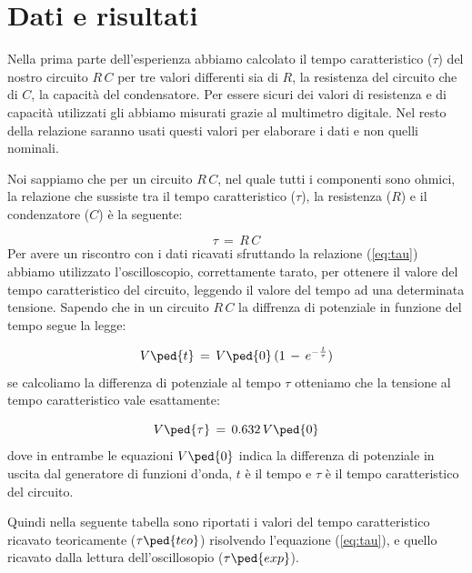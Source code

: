 \section*{Dati e risultati}

Nella prima parte dell'esperienza abbiamo calcolato il tempo caratteristico ($\tau$) del nostro circuito $R\,C$ per tre valori differenti sia di $R$, la resistenza del circuito che di $C$, la capacità del condensatore. Per essere sicuri dei valori di resistenza e di capacità utilizzati gli abbiamo misurati grazie al multimetro digitale. Nel resto della relazione saranno usati questi valori per elaborare i dati e non quelli nominali.

Noi sappiamo che per un circuito $R\,C$, nel quale tutti i componenti sono ohmici, la relazione che sussiste tra il tempo caratteristico ($\tau$), la resistenza ($R$) e il condenzatore ($C$) è la seguente:

\begin{equation}
	\tau \,=\, R\,C
	\label{eq:tau}
\end{equation}
%
Per avere un riscontro con i dati ricavati sfruttando la relazione (\ref{eq:tau}) abbiamo utilizzato l'oscilloscopio, correttamente tarato, per ottenere il valore del tempo caratteristico del circuito, leggendo il valore del tempo ad una determinata tensione. Sapendo che in un circuito $R\,C$ la diffrenza di potenziale in funzione del tempo segue la legge:

\begin{equation}
	V\ped{t} \,=\, V\ped{0}\,(1\,-\,e^{-\frac{t}{\tau}})
	\label{eq:potenziale}
\end{equation}
%
se calcoliamo la differenza di potenziale al tempo $\tau$ otteniamo che la tensione al tempo caratteristico vale esattamente:

\begin{equation}
	V\ped{\tau} \,=\, 0.632\,V\ped{0} 
\end{equation}
%
dove in entrambe le equazioni $V\ped{0}$ indica la differenza di potenziale in uscita dal generatore di funzioni d'onda, $t$ è il tempo e $\tau$ è il tempo caratteristico del circuito.

Quindi nella seguente tabella sono riportati i valori del tempo caratteristico ricavato teoricamente ($\tau\ped{teo}$) risolvendo l'equazione (\ref{eq:tau}), e quello ricavato dalla lettura dell'oscillosopio ($\tau\ped{exp}$).

